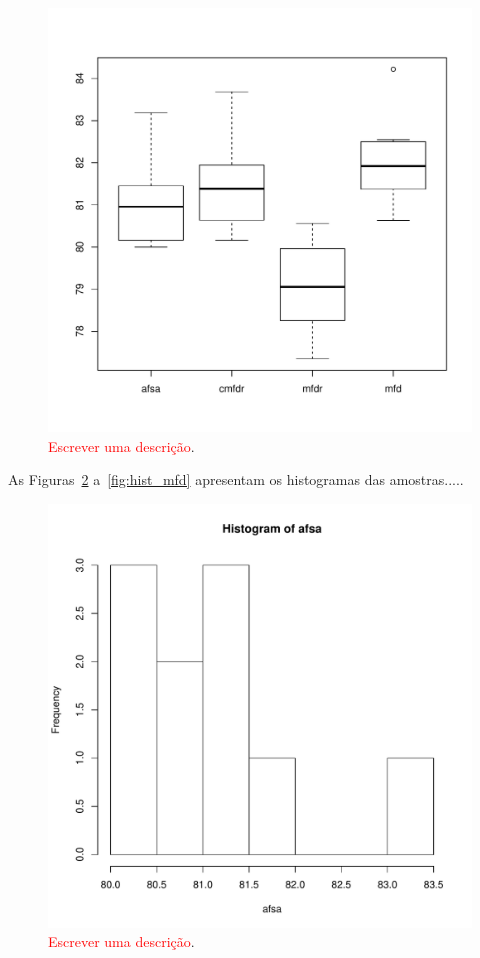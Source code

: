 \documentclass[conference]{IEEEtran}
\begin{document}
\begin{figure}[h]
	\centering
	\includegraphics[width=\linewidth]{img/boxplot.pdf}
	\caption{\textcolor{red}{Escrever uma descrição}.}
	\label{fig:boxplot}
\end{figure}

As Figuras~\ref{fig:hist_afsa} a~\ref{fig:hist_mfd} apresentam os histogramas das amostras.....

\begin{figure}[h]
	\centering
	\includegraphics[width=\linewidth]{img/hist_afsa.pdf}
	\caption{\textcolor{red}{Escrever uma descrição}.}
	\label{fig:hist_afsa}
\end{figure}
\end{document}
